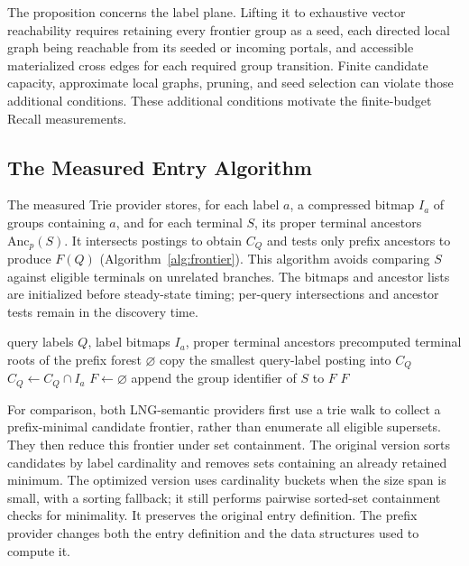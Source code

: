 The proposition concerns the label plane.  Lifting it to exhaustive vector
reachability requires retaining every frontier group as a seed, each directed local graph being reachable from its seeded or incoming
portals, and accessible materialized cross edges
for each required group transition.  Finite candidate capacity, approximate
local graphs, pruning, and seed selection can violate those additional
conditions.  These additional conditions motivate the finite-budget Recall measurements.

\subsection{The Measured Entry Algorithm}
The measured Trie provider stores, for each label $a$, a compressed bitmap
$I_a$ of groups containing $a$, and for each terminal $S$, its proper terminal
ancestors $\mathrm{Anc}_p(S)$.  It intersects postings to obtain $C_Q$ and
tests only prefix ancestors to produce $F(Q)$
(Algorithm~\ref{alg:frontier}).  This algorithm avoids comparing $S$ against
eligible terminals on unrelated branches.  The bitmaps and ancestor lists
are initialized before steady-state timing; per-query intersections and
ancestor tests remain in the discovery time.

\begin{algorithm}[t]
\caption{Bitmap-backed prefix frontier (measured provider)}
\label{alg:frontier}
\begin{algorithmic}[1]
\Require query labels $Q$, label bitmaps $I_a$, proper terminal ancestors
  \State \Return precomputed terminal roots of the prefix forest
\EndIf
{}
  \State \Return $\varnothing$
\EndIf
\State copy the smallest query-label posting into $C_Q$
  \State $C_Q\gets C_Q\cap I_a$
\EndFor
\State $F\gets\varnothing$
    \State append the group identifier of $S$ to $F$
  \EndIf
\EndFor
\State \Return $F$
\end{algorithmic}
\end{algorithm}

For comparison, both LNG-semantic providers first use a trie walk to collect
a prefix-minimal candidate frontier, rather than enumerate all eligible
supersets. They then reduce this frontier under set containment.  The original version sorts candidates by label cardinality and
removes sets containing an already retained minimum.  The optimized version
uses cardinality buckets when the size span is small, with a sorting fallback;
it still performs pairwise sorted-set containment checks for minimality.
It preserves the original entry definition.  The prefix provider changes both the entry definition and the
data structures used to compute it.

